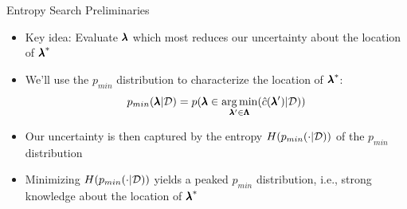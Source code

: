 \begin{frame}[c]{Entropy Search  Preliminaries}
\begin{itemize}
    \item Key idea: Evaluate $\pmb{\lambda}$ which most \alert{reduces our uncertainty about the location of ${\pmb{\lambda}}^*$}
\bigskip    
\fhpause    
    \item We'll use the $p_{min}$ distribution to characterize the location of ${\pmb{\lambda}}^*$: \alert{\[p_{min}(\pmb{\lambda}|\mathcal{D}) = p(\pmb{\lambda} \in \operatorname*{arg\,min}_{\pmb{\lambda}' \in \pmb{\Lambda}} (\hat{c}(\pmb{\lambda}') | \mathcal{D}))\]}
\medskip
\fhpause
    \item Our uncertainty is then captured by the \alert{entropy $H( p_{min}(\cdot |\mathcal{D}))$ of the $p_{min}$ distribution}
\fhpause
\bigskip    
    \item Minimizing $H( p_{min}(\cdot |\mathcal{D}))$ yields a peaked $p_{min}$ distribution, i.e., strong knowledge about the location of ${\pmb{\lambda}}^*$
    
\end{itemize}

\end{frame}
